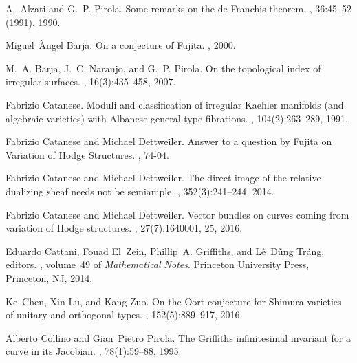 \documentclass[a4paper,11pt]{amsart}
\begin{document}
{	
	\begin{thebibliography}{CEZGT14}
		
		A.~Alzati and G.~P. Pirola.
		\newblock Some remarks on the de {F}ranchis theorem.
		, 36:45--52 (1991), 1990.
		
		Miguel~\`Angel Barja.
		\newblock On a conjecture of {F}ujita.
		, 2000.
		
		M.~A. Barja, J.~C. Naranjo, and G.~P. Pirola.
		\newblock On the topological index of irregular surfaces.
		, 16(3):435--458, 2007.
		
		Fabrizio Catanese.
		\newblock Moduli and classification of irregular {K}aehler manifolds (and
		algebraic varieties) with {A}lbanese general type fibrations.
		, 104(2):263--289, 1991.
		
		Fabrizio Catanese and Michael Dettweiler.
		\newblock Answer to a question by {F}ujita on {V}ariation of {H}odge
		{S}tructures.
		, 74-04.
		
		Fabrizio Catanese and Michael Dettweiler.
		\newblock The direct image of the relative dualizing sheaf needs not be
		semiample.
		, 352(3):241--244, 2014.
		
		Fabrizio Catanese and Michael Dettweiler.
		\newblock Vector bundles on curves coming from variation of {H}odge structures.
		, 27(7):1640001, 25, 2016.
		
		Eduardo Cattani, Fouad El~Zein, Phillip~A. Griffiths, and L{\^e}~D{\~u}ng
		Tr{\'a}ng, editors.
		, volume~49 of {\em Mathematical Notes}.
		\newblock Princeton University Press, Princeton, NJ, 2014.
		
		Ke~Chen, Xin Lu, and Kang Zuo.
		\newblock On the {O}ort conjecture for {S}himura varieties of unitary and
		orthogonal types.
		, 152(5):889--917, 2016.
		
		Alberto Collino and Gian~Pietro Pirola.
		\newblock The {G}riffiths infinitesimal invariant for a curve in its
		{J}acobian.
		, 78(1):59--88, 1995.
		

\end{thebibliography}}
\end{document}
